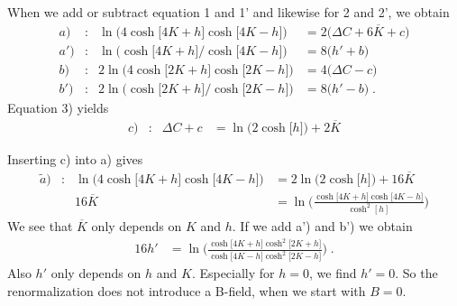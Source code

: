 %
When we add or subtract equation 1 and 1' and likewise for 2 and 2', we obtain
%
\begin{align*}
a)&:& \ln\bigg(4\cosh\big[4 K+h  \big] \cosh\big[4 K-h  \big] \bigg) &= 2\bigg( 
  \Delta C + 6\overline K +c   \bigg)\\
a')&:&  \ln\bigg(\cosh\big[4 K+h  \big]/ \cosh\big[4 K-h  \big] \bigg) &= 8\big( h' +b
 \big)\\
b)&:&2\ln\bigg(4\cosh\big[2 K+h  \big]\cosh\big[2 K-h  \big]  \bigg) &=
4\bigg( \Delta C -c \bigg)\\
b')&:&2\ln\bigg(\cosh\big[2 K+h  \big]/\cosh\big[2 K-h  \big]  \bigg) &=
8\bigg(h' -b \bigg)\;.
\end{align*}
Equation 3) yields
%
\begin{align*}
c) &:& \Delta C +c   &=
\ln\bigg(2\cosh\big[h  \big]  \bigg) + 2 \overline K
\end{align*}
%
  
%
Inserting c) into a) gives
\begin{align*}
\tilde a)&:& \ln\bigg(4\cosh\big[4 K+h  \big] \cosh\big[4 K-h  \big] \bigg) &= 2
 \ln\bigg(2\cosh\big[h  \big]  \bigg)+ 16\overline K   \\
&&16 \overline K &= \ln\bigg(
\frac{\cosh\big[4 K+h  \big] \cosh\big[4 K-h  \big] }{\cosh^{2}[h]}
  \bigg)
\end{align*}
%
We see that $\overline K$ only depends on $K$ and $h$.
If we add a') and b') we obtain
%
\begin{align*}
16 h' &=
\ln\bigg( 
\frac{\cosh\big[4 K+h  \big]\cosh^{2}\big[2 K+h  \big]}{\cosh\big[4 K-h  \big]\cosh^{2}\big[2 K-h  \big]  }
 \bigg)\;.
\end{align*}
%
Also $h'$ only depends on $h$ and $K$. Especially for $h=0$, we find $h'=0$. So 
the renormalization does not introduce a B-field, when we start with $B=0$. 

